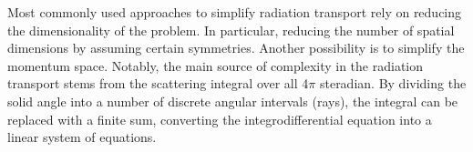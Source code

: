 Most commonly used approaches to simplify radiation transport rely 
on reducing the dimensionality of the problem. In particular,  
reducing the number of spatial dimensions by assuming certain symmetries.
Another possibility is to simplify the momentum space. 
%
%
Notably, the main source of complexity in the radiation transport stems from the scattering 
integral over all 4$\pi$ steradian.
By dividing the solid angle into a number of discrete angular intervals (rays), the 
integral can be replaced with a finite sum, converting the integrodifferential equation 
into a linear system of equations. %
%
